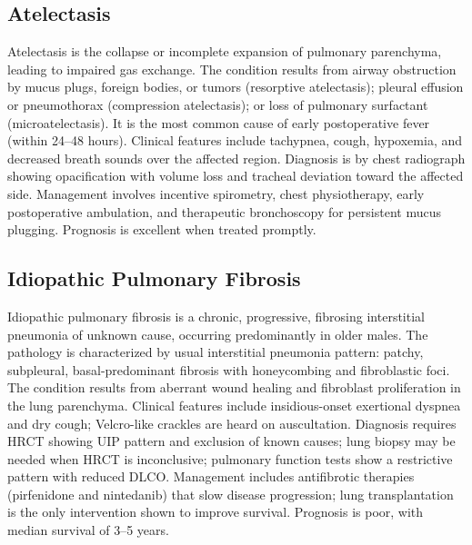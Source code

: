 \subsection{Atelectasis}
\label{sec:Atelectasis}
Atelectasis is the collapse or incomplete expansion of pulmonary parenchyma, leading to impaired gas exchange. The condition results from airway obstruction by mucus plugs, foreign bodies, or tumors (resorptive atelectasis); pleural effusion or pneumothorax (compression atelectasis); or loss of pulmonary surfactant (microatelectasis). It is the most common cause of early postoperative fever (within 24--48 hours). Clinical features include tachypnea, cough, hypoxemia, and decreased breath sounds over the affected region. Diagnosis is by chest radiograph showing opacification with volume loss and tracheal deviation toward the affected side. Management involves incentive spirometry, chest physiotherapy, early postoperative ambulation, and therapeutic bronchoscopy for persistent mucus plugging. Prognosis is excellent when treated promptly.

\subsection{Idiopathic Pulmonary Fibrosis}
\label{sec:Idiopathic Pulmonary Fibrosis}
Idiopathic pulmonary fibrosis is a chronic, progressive, fibrosing interstitial pneumonia of unknown cause, occurring predominantly in older males. The pathology is characterized by usual interstitial pneumonia pattern: patchy, subpleural, basal-predominant fibrosis with honeycombing and fibroblastic foci. The condition results from aberrant wound healing and fibroblast proliferation in the lung parenchyma. Clinical features include insidious-onset exertional dyspnea and dry cough; Velcro-like crackles are heard on auscultation. Diagnosis requires HRCT showing UIP pattern and exclusion of known causes; lung biopsy may be needed when HRCT is inconclusive; pulmonary function tests show a restrictive pattern with reduced DLCO. Management includes antifibrotic therapies (pirfenidone and nintedanib) that slow disease progression; lung transplantation is the only intervention shown to improve survival. Prognosis is poor, with median survival of 3--5 years.


